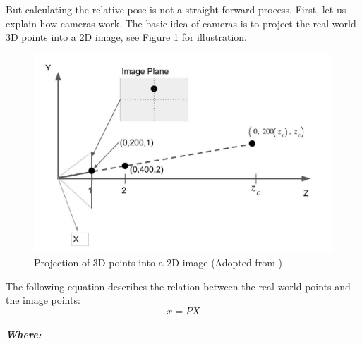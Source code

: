 But calculating the relative pose is not a straight forward process. First, let us explain how cameras work. The basic idea of cameras is to project the real world 3D points into a 2D image, see Figure \ref{camera projection illustration image} for illustration.
\begin{figure}[h] %
	\centering
	\includegraphics[width=\textwidth]{assets/ch3/camera projection illustration image.jpg}
	\caption{Projection of 3D points into a 2D image (Adopted from \cite{SingleCamera3D})}
	\label{camera projection illustration image}
\end{figure}
The following equation describes the relation between the real world points and the image points:
\begin{equation}
x = PX\label{x = PX}
\end{equation}
\subparagraph{Where:}
